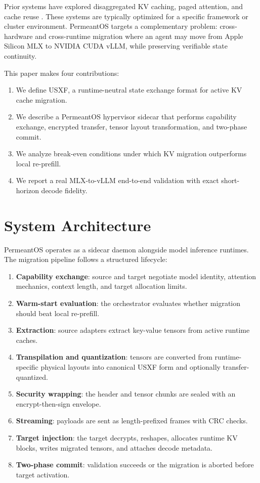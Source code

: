 \documentclass[11pt]{article}
\begin{document}
Prior systems have explored disaggregated KV caching, paged attention, and cache reuse \cite{kwon2023pagedattention, zheng2024lmsys, liu2024cachegen}. These systems are typically optimized for a specific framework or cluster environment. PermeantOS targets a complementary problem: cross-hardware and cross-runtime migration where an agent may move from Apple Silicon MLX to NVIDIA CUDA vLLM, while preserving verifiable state continuity.

This paper makes four contributions:
\begin{enumerate}[leftmargin=*]
  \item We define USXF, a runtime-neutral state exchange format for active KV cache migration.
  \item We describe a PermeantOS hypervisor sidecar that performs capability exchange, encrypted transfer, tensor layout transformation, and two-phase commit.
  \item We analyze break-even conditions under which KV migration outperforms local re-prefill.
  \item We report a real MLX-to-vLLM end-to-end validation with exact short-horizon decode fidelity.
\end{enumerate}

\section{System Architecture}

PermeantOS operates as a sidecar daemon alongside model inference runtimes. The migration pipeline follows a structured lifecycle:

\begin{enumerate}[leftmargin=*]
  \item \textbf{Capability exchange}: source and target negotiate model identity, attention mechanics, context length, and target allocation limits.
  \item \textbf{Warm-start evaluation}: the orchestrator evaluates whether migration should beat local re-prefill.
  \item \textbf{Extraction}: source adapters extract key-value tensors from active runtime caches.
  \item \textbf{Transpilation and quantization}: tensors are converted from runtime-specific physical layouts into canonical USXF form and optionally transfer-quantized.
  \item \textbf{Security wrapping}: the header and tensor chunks are sealed with an encrypt-then-sign envelope.
  \item \textbf{Streaming}: payloads are sent as length-prefixed frames with CRC checks.
  \item \textbf{Target injection}: the target decrypts, reshapes, allocates runtime KV blocks, writes migrated tensors, and attaches decode metadata.
  \item \textbf{Two-phase commit}: validation succeeds or the migration is aborted before target activation.
\end{enumerate}
\end{document}
